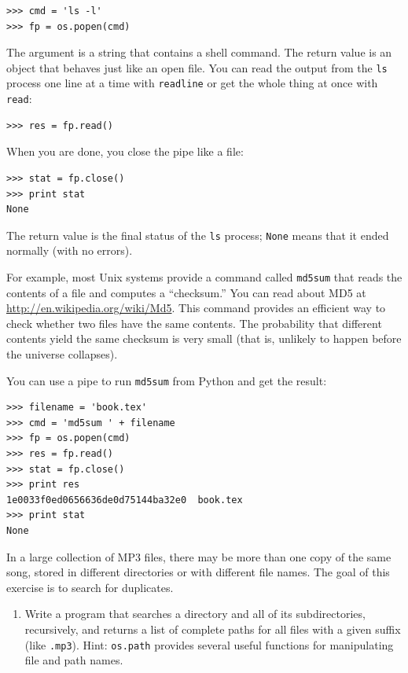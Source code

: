 \documentclass[10pt]{book}
\begin{document}
\begin{CJK}{UTF8}{gbsn}
\begin{verbatim}
>>> cmd = 'ls -l'
>>> fp = os.popen(cmd)
\end{verbatim}
%
The argument is a string that contains a shell command.  The
return value is an object that behaves just like an open
file.  You can read the output from the {\tt ls} process one
line at a time with {\tt readline} or get the whole thing at
once with {\tt read}:

\begin{verbatim}
>>> res = fp.read()
\end{verbatim}
%
When you are done, you close the pipe like a file:

\begin{verbatim}
>>> stat = fp.close()
>>> print stat
None
\end{verbatim}
%
The return value is the final status of the {\tt ls} process;
{\tt None} means that it ended normally (with no errors).

For example, most Unix systems provide a command called {\tt md5sum}
that reads the contents of a file and computes a ``checksum.''
You can read about MD5 at \url{http://en.wikipedia.org/wiki/Md5}.  This
command provides an efficient way to check whether two files
have the same contents.  The probability that different contents
yield the same checksum is very small (that is, unlikely to happen
before the universe collapses).

You can use a pipe to run {\tt md5sum} from Python and get the result:

\begin{verbatim}
>>> filename = 'book.tex'
>>> cmd = 'md5sum ' + filename
>>> fp = os.popen(cmd)
>>> res = fp.read()
>>> stat = fp.close()
>>> print res
1e0033f0ed0656636de0d75144ba32e0  book.tex
>>> print stat
None
\end{verbatim}


\begin{exercise}
\label{checksum}

In a large collection of MP3 files, there may be more than one
copy of the same song, stored in different directories or with
different file names.  The goal of this exercise is to search for
duplicates.

\begin{enumerate}

\item Write a program that searches a directory and all of its
subdirectories, recursively, and returns a list of complete paths
for all files with a given suffix (like {\tt .mp3}).
Hint: {\tt os.path} provides several useful functions for
manipulating file and path names.


\end{enumerate}
\end{exercise}
\end{CJK}
\end{document}
